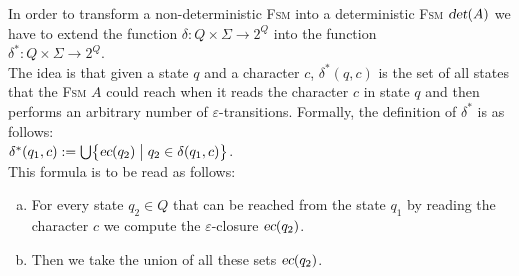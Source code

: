 \noindent
In order to transform a non-deterministic \textsc{Fsm} into a deterministic \textsc{Fsm}
$\textsl{det}(A)$ we have to extend the function $\delta:Q \times \Sigma \rightarrow 2^Q$ into the function
\\[0.2cm]
\hspace*{1.3cm}
$\delta^*: Q \times \Sigma \rightarrow 2^Q$.
\\[0.2cm]
The idea is that given a state $q$ and a character $c$,  $\delta^*(q,c)$ is the set of all states that the
\textsc{Fsm} $A$ could reach when it reads the character $c$ in state $q$ and then performs an arbitrary number
of $\varepsilon$-transitions.  Formally, the definition of $\delta^*$ is as follows:
\\[0.2cm]
\hspace*{1.3cm}
$\delta^*(q_1, c) := \bigcup \bigl\{ \textsl{ec}(q_2) \bigm| q_2 \in \delta(q_1, c) \bigr \}$.
\\[0.2cm]
This formula is to be read as follows:
\begin{enumerate}[(a)]
\item For every state $q_2 \in Q$ that can be reached from the state $q_1$ by reading the character $c$ we
      compute the $\varepsilon$-closure $\textsl{ec}(q_2)$.
\item Then we take the union of all these sets $\textsl{ec}(q_2)$.
\end{enumerate}

